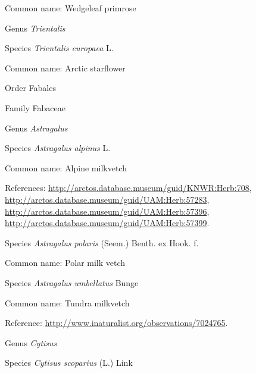 \documentclass[9pt, article]{memoir}
\begin{document}
\begin{multicols}{2}
Common name: Wedgeleaf primrose

\vspace{6pt}\noindent\hspace{30pt}Genus \textit{Trientalis}


\vspace{6pt}\noindent\hspace{36pt}Species \textit{Trientalis europaea} L.


Common name: Arctic starflower

\vspace{6pt}\noindent\hspace{18pt}Order Fabales


\vspace{6pt}\noindent\hspace{24pt}Family Fabaceae


\vspace{6pt}\noindent\hspace{30pt}Genus \textit{Astragalus}


\vspace{6pt}\noindent\hspace{36pt}Species \textit{Astragalus alpinus} L.


Common name: Alpine milkvetch

References: 
\url{http://arctos.database.museum/guid/KNWR:Herb:708}, 
\url{http://arctos.database.museum/guid/UAM:Herb:57283}, 
\url{http://arctos.database.museum/guid/UAM:Herb:57396}, 
\url{http://arctos.database.museum/guid/UAM:Herb:57399}.

\vspace{6pt}\noindent\hspace{36pt}Species \textit{Astragalus polaris} (Seem.) Benth. ex Hook. f.


Common name: Polar milk vetch

\vspace{6pt}\noindent\hspace{36pt}Species \textit{Astragalus umbellatus} Bunge


Common name: Tundra milkvetch

Reference: 
\url{http://www.inaturalist.org/observations/7024765}.

\vspace{6pt}\noindent\hspace{30pt}Genus \textit{Cytisus}


\vspace{6pt}\noindent\hspace{36pt}Species \textit{Cytisus scoparius} (L.) Link



\end{multicols}
\end{document}
